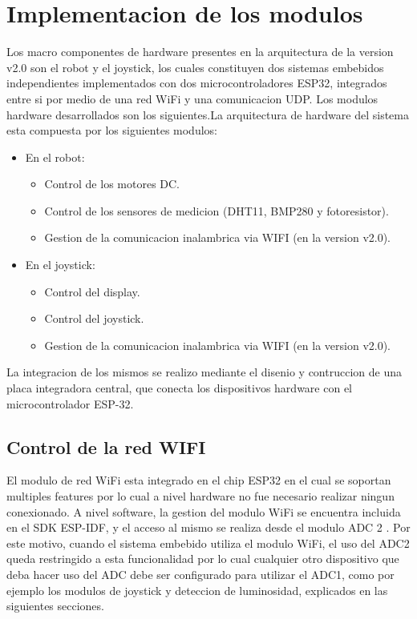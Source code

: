 \section{Implementacion de los modulos}

Los macro componentes de hardware presentes en la arquitectura de la version v2.0 son el robot y el joystick, los cuales constituyen dos sistemas embebidos independientes implementados con dos microcontroladores ESP32, integrados entre si por medio de una red WiFi y una comunicacion UDP. Los modulos hardware desarrollados son los siguientes.La arquitectura de hardware del sistema esta compuesta por los siguientes modulos:


\begin{itemize}
	\item En el robot:
	\begin{itemize}
		\item Control de los motores DC.	
		\item Control de los sensores de medicion (DHT11, BMP280 y fotoresistor).
		\item Gestion de la  comunicacion inalambrica via WIFI (en la version v2.0).
	\end{itemize}
	\item En el joystick:
	\begin{itemize}
		\item Control del display.
		\item Control del joystick.
		\item Gestion de la  comunicacion inalambrica via WIFI (en la version v2.0).
	\end{itemize}
\end{itemize}

La integracion de los mismos se realizo mediante el disenio y contruccion de una placa integradora central, que conecta los dispositivos hardware con el microcontrolador ESP-32.


\subsection{Control de la red WIFI}

El modulo de red WiFi esta integrado en el chip ESP32 en el cual se soportan multiples features \cite{ESP32_WiFi} por lo cual a nivel hardware no fue necesario realizar ningun conexionado. 
A nivel software, la gestion del modulo WiFi se encuentra incluida en el SDK ESP-IDF, y el acceso al mismo se realiza desde el modulo ADC 2 \cite{ESP32_adc}. Por este motivo, cuando el sistema embebido utiliza el modulo WiFi, el uso del ADC2 queda restringido a esta funcionalidad por lo cual cualquier otro dispositivo que deba hacer uso del ADC debe ser configurado para utilizar el ADC1, como por ejemplo los modulos de joystick y deteccion de luminosidad, explicados en las siguientes secciones.

